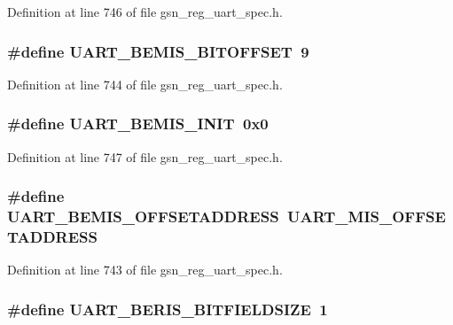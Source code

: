 Definition at line 746 of file gsn\_\-reg\_\-uart\_\-spec.h.

\hypertarget{a00575_ab355d117d95b79f20c5aa09c241f5324}{
\subsubsection[{UART\_\-BEMIS\_\-BITOFFSET}]{\setlength{\rightskip}{0pt plus 5cm}\#define UART\_\-BEMIS\_\-BITOFFSET~9}}
\label{a00575_ab355d117d95b79f20c5aa09c241f5324}


Definition at line 744 of file gsn\_\-reg\_\-uart\_\-spec.h.

\hypertarget{a00575_a1732bc2890bc0dea900549fb47a1f477}{
\subsubsection[{UART\_\-BEMIS\_\-INIT}]{\setlength{\rightskip}{0pt plus 5cm}\#define UART\_\-BEMIS\_\-INIT~0x0}}
\label{a00575_a1732bc2890bc0dea900549fb47a1f477}


Definition at line 747 of file gsn\_\-reg\_\-uart\_\-spec.h.

\hypertarget{a00575_aeedea630547eacc7004bb090116fc952}{
\subsubsection[{UART\_\-BEMIS\_\-OFFSETADDRESS}]{\setlength{\rightskip}{0pt plus 5cm}\#define UART\_\-BEMIS\_\-OFFSETADDRESS~UART\_\-MIS\_\-OFFSETADDRESS}}
\label{a00575_aeedea630547eacc7004bb090116fc952}


Definition at line 743 of file gsn\_\-reg\_\-uart\_\-spec.h.

\hypertarget{a00575_abe02c862ea519a5342da68e629fb794e}{
\subsubsection[{UART\_\-BERIS\_\-BITFIELDSIZE}]{\setlength{\rightskip}{0pt plus 5cm}\#define UART\_\-BERIS\_\-BITFIELDSIZE~1}}
\label{a00575_abe02c862ea519a5342da68e629fb794e}



